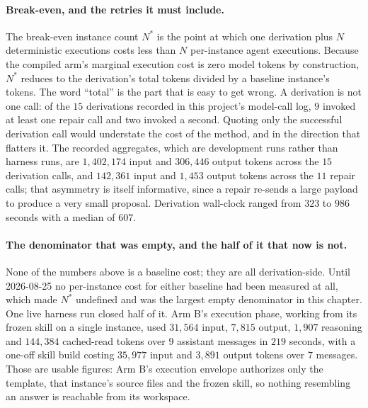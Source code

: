 \paragraph{Break-even, and the retries it must include.}
The break-even instance count $N^{*}$ is the point at which one derivation plus $N$
deterministic executions costs less than $N$ per-instance agent executions. Because the
compiled arm's marginal execution cost is zero model tokens by construction, $N^{*}$ reduces
to the derivation's total tokens divided by a baseline instance's tokens. The word ``total''
is the part that is easy to get wrong. A derivation is not one call: of the $15$ derivations
recorded in this project's model-call log, $9$ invoked at least one repair call and two
invoked a second. Quoting only the successful derivation call would understate the cost of the
method, and in the direction that flatters it. The recorded aggregates, which are development
runs rather than harness runs, are $1{,}402{,}174$ input and $306{,}446$ output tokens across
the $15$ derivation calls, and $142{,}361$ input and $1{,}453$ output tokens across the $11$
repair calls; that asymmetry is itself informative, since a repair re-sends a large payload to
produce a very small proposal. Derivation wall-clock ranged from $323$ to $986$ seconds with a
median of $607$.

\paragraph{The denominator that was empty, and the half of it that now is not.}
None of the numbers above is a baseline cost; they are all derivation-side. Until 2026-08-25
no per-instance cost for either baseline had been measured at all, which made $N^{*}$
undefined and was the largest empty denominator in this chapter. One live harness run closed
half of it. Arm B's execution phase, working from its frozen skill on a single instance, used
$31{,}564$ input, $7{,}815$ output, $1{,}907$ reasoning and $144{,}384$ cached-read tokens
over $9$ assistant messages in $219$ seconds, with a one-off skill build costing $35{,}977$
input and $3{,}891$ output tokens over $7$ messages. Those are usable figures: Arm B's
execution envelope authorizes only the template, that instance's source files and the frozen
skill, so nothing resembling an answer is reachable from its workspace.

